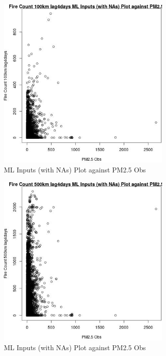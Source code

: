 \begin{figure} 
\centering  
\includegraphics[width=0.77\textwidth]{Code_Outputs/Report_ML_input_PM25_Step4_part_e_de_duplicated_aves_compiled_2019-05-21wNAs_Fire_Count_100km_lag4daysvPM25_Obs.jpg} 
\caption{\label{fig:Report_ML_input_PM25_Step4_part_e_de_duplicated_aves_compiled_2019-05-21wNAsFire_Count_100km_lag4daysvPM25_Obs}ML Inputs (with NAs) Plot against PM2.5 Obs} 
\end{figure} 
 

\clearpage 

\begin{figure} 
\centering  
\includegraphics[width=0.77\textwidth]{Code_Outputs/Report_ML_input_PM25_Step4_part_e_de_duplicated_aves_compiled_2019-05-21wNAs_Fire_Count_500km_lag4daysvPM25_Obs.jpg} 
\caption{\label{fig:Report_ML_input_PM25_Step4_part_e_de_duplicated_aves_compiled_2019-05-21wNAsFire_Count_500km_lag4daysvPM25_Obs}ML Inputs (with NAs) Plot against PM2.5 Obs} 
\end{figure} 
 


